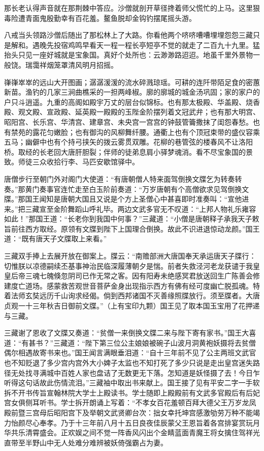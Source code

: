 \documentclass[12pt,UTF8]{ctexbook}
\begin{document}
那长老认得声音就在那荆棘中答应。沙僧就剖开草径搀着师父慌忙的上马。这里狠毒险遭青面鬼殷勤幸有百花羞。鳌鱼脱却金钩钓摆尾摇头游。

八戒当头领路沙僧后随出了那松林上了大路。你看他两个哜哜嘈嘈埋埋怨怨三藏只是解和。遇晚先投宿鸡鸣早看天一程一程长亭短亭不觉的就走了二百九十九里。猛抬头只见一座好城就是宝象国。真好个处所也：云渺渺路迢迢。地虽千里外景物一般饶。瑞霭祥烟笼罩清风明月招摇。

嵂嵂崒崒的远山大开图画；潺潺湲湲的流水碎溅琼瑶。可耕的连阡带陌足食的密蕙新苗。渔钓的几家三涧曲樵采的一担两峰椒。廓的廓城的城金汤巩固；家的家户的户只斗逍遥。九重的高阁如殿宇万丈的层台似锦标。也有那太极殿、华盖殿、烧香殿、观文殿、宣政殿、延英殿一殿殿的玉陛金阶摆列着文冠武弁；也有那大明宫、昭阳宫、长乐宫、华清宫、建章宫、未央宫一宫宫的钟鼓管籥撒抹了闺怨春愁。也有禁苑的露花匀嫩脸；也有御沟的风柳舞纤腰。通衢上也有个顶冠束带的盛仪容乘五马；幽僻中也有个持弓挟矢的拨云雾贯双雕。花柳的巷管弦的楼春风不让洛阳桥。取经的长老回大唐肝胆裂；伴师的徒弟息肩小驿梦魂消。看不尽宝象国的景致。师徒三众收拾行李、马匹安歇馆驿中。

唐僧步行至朝门外对阁门大使道：“有唐朝僧人特来面驾倒换文牒乞为转奏转奏。”那黄门奏事官连忙走至白玉阶前奏道：“万岁唐朝有个高僧欲求见驾倒换文牒。”那国王闻知是唐朝大国且又说是个方上圣僧心中甚喜即时准奏叫：“宣他进来。”把三藏宣至金阶舞蹈山呼礼毕。两边文武多官无不叹道：“上邦人物礼乐雍容如此！”那国王道：“长老你到我国中何事？”三藏道：“小僧是唐朝释子承我天子敕旨前往西方取经。原领有文牒到陛下上国理合倒换。故此不识进退惊动龙颜。”国王道：“既有唐天子文牒取上来看。”

三藏双手捧上去展开放在御案上。牒云：“南赡部洲大唐国奉天承运唐天子牒行：切惟朕以凉德嗣续丕基事神治民临深履薄朝夕是惴。前者失救泾河老龙获谴于我皇皇后帝三魂七魄倏忽阴司已作无常之客。因有阳寿未绝感冥君放送回生广陈善会修建度亡道场。感蒙救苦观世音菩萨金身出现指示西方有佛有经可度幽亡脱孤魂。特着法师玄奘远历千山询求经偈。倘到西邦诸国不灭善缘照牒放行。须至牒者。大唐贞观一十三年秋吉日御前文牒。”（上有宝印九颗）国王见了取本国玉宝用了花押递与三藏。

三藏谢了恩收了文牒又奏道：“贫僧一来倒换文牒二来与陛下寄有家书。”国王大喜道：“有甚书？”三藏道：“陛下第三位公主娘娘被碗子山波月洞黄袍妖摄将去贫僧偶尔相遇故寄书来也。”国王闻言满眼垂泪道：“自十三年前不见了公主两班文武官也不知贬退了多少宫内宫外大小婢子太监也不知打死了多少只说是走出皇宫迷失路径无处找寻满城中百姓人家也盘诘了无数更无下落。怎知道是妖怪摄了去！今日乍听得这句话故此伤情流泪。”三藏袖中取出书来献上。国王接了见有平安二字一手软拆不开书传旨宣翰林院大学士上殿读书。学士随即上殿殿前有文武多官殿后有后妃宫女俱侧耳听书。学士拆开朗诵上写着：“不孝女百花羞顿百拜大德父王万岁龙凤殿前暨三宫母后昭阳宫下及举朝文武贤卿台次：拙女幸托坤宫感激劬劳万种不能竭力怡颜尽心奉孝。乃于十三年前八月十五日良夜佳辰蒙父王恩旨着各宫排宴赏玩月华共乐清霄盛会。正欢娱之间不觉一阵香风闪出个金睛蓝面青魔王将女擒住驾祥光直带至半野山中无人处难分难辨被妖倚强霸占为妻。
\end{document}
